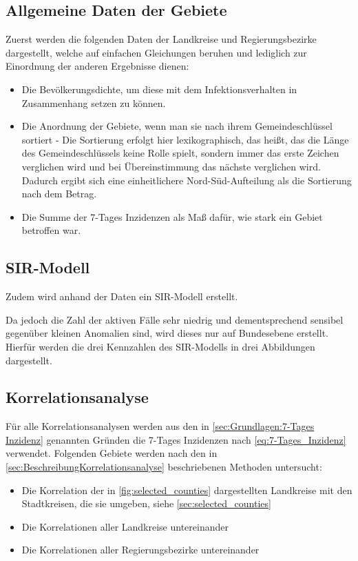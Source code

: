 \subsection{Allgemeine Daten der Gebiete}
Zuerst werden die folgenden Daten der Landkreise und Regierungsbezirke dargestellt, welche auf einfachen Gleichungen beruhen und lediglich zur Einordnung der anderen Ergebnisse dienen:
\begin{itemize}
    \item Die Bevölkerungsdichte, um diese mit dem Infektionsverhalten in Zusammenhang setzen zu können.
    \item Die Anordnung der Gebiete, wenn man sie nach ihrem Gemeindeschlüssel sortiert - Die Sortierung erfolgt hier lexikographisch, das heißt, das die Länge des Gemeindeschlüssels keine Rolle spielt, sondern immer das erste Zeichen verglichen wird und bei Übereinstimmung das nächste verglichen wird. Dadurch ergibt sich eine einheitlichere Nord-Süd-Aufteilung als die Sortierung nach dem Betrag.
    \item Die Summe der 7-Tages Inzidenzen als Maß dafür, wie stark ein Gebiet betroffen war.
\end{itemize}
\subsection{SIR-Modell}
Zudem wird anhand der Daten ein SIR-Modell erstellt.


Da jedoch die Zahl der aktiven Fälle sehr niedrig und dementsprechend sensibel gegenüber kleinen Anomalien sind, wird dieses nur auf Bundesebene erstellt. 
Hierfür werden die drei Kennzahlen des SIR-Modells in drei Abbildungen dargestellt.
\subsection{Korrelationsanalyse}
Für alle Korrelationsanalysen werden aus den in \autoref{sec:Grundlagen:7-Tages Inzidenz} genannten Gründen die 7-Tages Inzidenzen nach \autoref{eq:7-Tages_Inzidenz} verwendet. Folgenden Gebiete werden nach den in \autoref{sec:BeschreibungKorrelationsanalyse} beschriebenen Methoden untersucht:
\begin{itemize}
    \item Die Korrelation der in \autoref{fig:selected_counties} dargestellten Landkreise mit den Stadtkreisen, die sie umgeben, siehe \autoref{sec:selected_counties}
    \item Die Korrelationen aller Landkreise untereinander
    \item Die Korrelationen aller Regierungsbezirke untereinander
\end{itemize}


